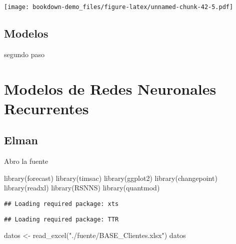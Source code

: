 \documentclass[
]{book}
\newenvironment{Shaded}{\begin{snugshade}}{\end{snugshade}}
\newcommand{\CommentTok}[1]{\textcolor[rgb]{0.56,0.35,0.01}{\textit{#1}}}
\newcommand{\FunctionTok}[1]{\textcolor[rgb]{0.00,0.00,0.00}{#1}}
\newcommand{\NormalTok}[1]{#1}
\newcommand{\OtherTok}[1]{\textcolor[rgb]{0.56,0.35,0.01}{#1}}
\newcommand{\StringTok}[1]{\textcolor[rgb]{0.31,0.60,0.02}{#1}}
\begin{document}
\texttt{[image: bookdown-demo\_files/figure-latex/unnamed-chunk-42-5.pdf]}

\hypertarget{modelos-1}{%
\section{Modelos}\label{modelos-1}}

segundo paso

\begin{Shaded}
\end{Shaded}

\hypertarget{modelos-de-redes-neuronales-recurrentes}{%
\chapter{Modelos de Redes Neuronales Recurrentes}\label{modelos-de-redes-neuronales-recurrentes}}

\hypertarget{elman}{%
\section{Elman}\label{elman}}

Abro la fuente

\begin{Shaded}
\begin{Highlighting}[]
\FunctionTok{library}\NormalTok{(forecast)}
\FunctionTok{library}\NormalTok{(timsac)}
\FunctionTok{library}\NormalTok{(ggplot2)}
\FunctionTok{library}\NormalTok{(changepoint)}
\FunctionTok{library}\NormalTok{(readxl)}
\FunctionTok{library}\NormalTok{(RSNNS)}
\FunctionTok{library}\NormalTok{(quantmod)}
\end{Highlighting}
\end{Shaded}

\begin{verbatim}
## Loading required package: xts
\end{verbatim}

\begin{verbatim}
## Loading required package: TTR
\end{verbatim}

\begin{Shaded}
\begin{Highlighting}[]
\NormalTok{datos }\OtherTok{\textless{}{-}} \FunctionTok{read\_excel}\NormalTok{(}\StringTok{"./fuente/BASE\_Clientes.xlsx"}\NormalTok{)}
\NormalTok{datos}
\end{Highlighting}
\end{Shaded}
\end{document}
